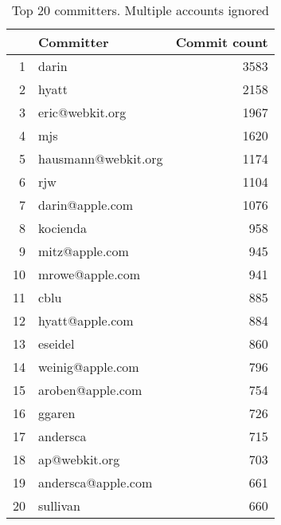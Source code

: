 \begin{table}[!htpb]
\begin{center}
\begin{tabular}{rlr}
  \hline
 & Committer & Commit count \\ 
  \hline
1 & darin & 3583 \\ 
  2 & hyatt & 2158 \\ 
  3 & eric@webkit.org & 1967 \\ 
  4 & mjs & 1620 \\ 
  5 & hausmann@webkit.org & 1174 \\ 
  6 & rjw & 1104 \\ 
  7 & darin@apple.com & 1076 \\ 
  8 & kocienda & 958 \\ 
  9 & mitz@apple.com & 945 \\ 
  10 & mrowe@apple.com & 941 \\ 
  11 & cblu & 885 \\ 
  12 & hyatt@apple.com & 884 \\ 
  13 & eseidel & 860 \\ 
  14 & weinig@apple.com & 796 \\ 
  15 & aroben@apple.com & 754 \\ 
  16 & ggaren & 726 \\ 
  17 & andersca & 715 \\ 
  18 & ap@webkit.org & 703 \\ 
  19 & andersca@apple.com & 661 \\ 
  20 & sullivan & 660 \\ 
   \hline
\end{tabular}
\caption{Top 20 committers. Multiple accounts ignored}
\label{commits:top20}
\end{center}
\end{table}
